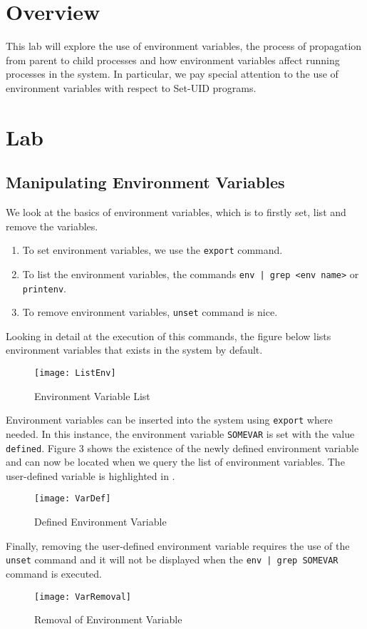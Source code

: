 \documentclass[a4paper,12pt]{article}
\begin{document}
\section{Overview}
This lab will explore the use of environment variables, the process of propagation from parent to child processes and how environment variables affect running processes in the system. In particular, we pay special attention to the use of environment variables with respect to Set-UID programs.
\newpage
\section{Lab}
\subsection{Manipulating Environment Variables}
{\par \noindent We look at the basics of environment variables, which is to firstly set, list and remove the variables.}
\begin{enumerate}
	\item To set environment variables, we use the \texttt{export} command.
	\item To list the environment variables, the commands \texttt{env | grep <env name>} or \texttt{printenv}.
	\item To remove environment variables, \texttt{unset} command is nice.
\end{enumerate}
{\par \noindent Looking in detail at the execution of this commands, the figure below lists environment variables that exists in the system by default.}
\begin{figure}[H]
	\centering
	\texttt{[image: ListEnv]}
	\caption{Environment Variable List}
	\label{fig:listenv}
\end{figure}

{\par \noindent Environment variables can be inserted into the system using \texttt{export} where needed. In this instance, the environment variable \texttt{SOMEVAR} is set with the value \texttt{defined}. Figure 3 shows the existence of the newly defined environment variable and can now be located when we query the list of environment variables. The user-defined variable is highlighted in .}
\begin{figure}[H]
	\centering
	\texttt{[image: VarDef]}
	\caption{Defined Environment Variable}
	\label{fig:vardef}
\end{figure}
{\par \noindent Finally, removing the user-defined environment variable requires the use of the \texttt{unset} command and it will not be displayed when the \texttt{env | grep SOMEVAR} command is executed.}
\begin{figure}[H]
	\centering
	\texttt{[image: VarRemoval]}
	\caption{Removal of Environment Variable}
	\label{fig:varremoval}
\end{figure}
\end{document}
